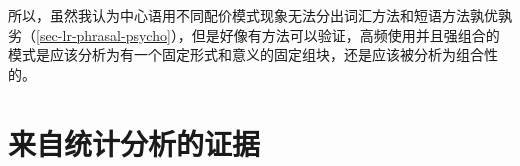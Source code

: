 \begin{exe}
\begin{xlist}[iv.]
\begin{exe}
\begin{xlist}[iv.]



所以，虽然我认为中心语用不同配价模式现象无法分出词汇方法和短语方法孰优孰劣（\ref{sec-lr-phrasal-psycho}），但是好像有方法可以验证，高频使用并且强组合的模式是应该分析为有一个固定形式和意义的固定组块，还是应该被分析为组合性的。

\section{来自统计分析的证据}
\label{stat-sec}


\end{xlist}
\end{exe}
\end{xlist}
\end{exe}
